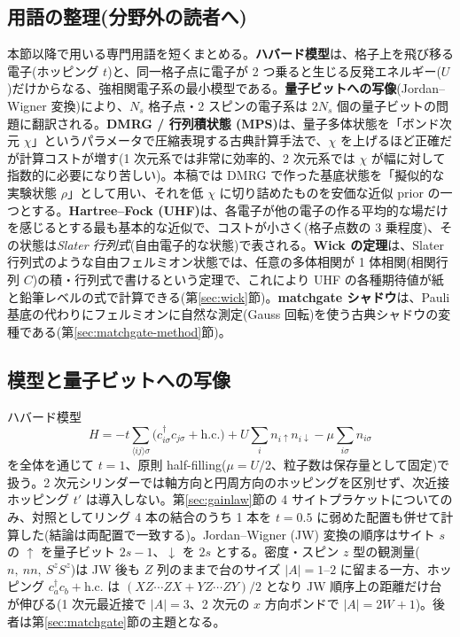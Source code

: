 \documentclass[11pt,a4paper]{ltjsarticle}
\begin{document}
\subsection*{用語の整理(分野外の読者へ)}
本節以降で用いる専門用語を短くまとめる。\textbf{ハバード模型}は、格子上を飛び移る電子(ホッピング $t$)と、同一格子点に電子が 2 つ乗ると生じる反発エネルギー($U$)だけからなる、強相関電子系の最小模型である。\textbf{量子ビットへの写像}(Jordan--Wigner 変換)により、$N_s$ 格子点・2 スピンの電子系は $2N_s$ 個の量子ビットの問題に翻訳される。\textbf{DMRG / 行列積状態 (MPS)}は、量子多体状態を「ボンド次元 $\chi$」というパラメータで圧縮表現する古典計算手法で、$\chi$ を上げるほど正確だが計算コストが増す(1 次元系では非常に効率的、2 次元系では $\chi$ が幅に対して指数的に必要になり苦しい)。本稿では DMRG で作った基底状態を「擬似的な実験状態 $\rho$」として用い、それを低 $\chi$ に切り詰めたものを安価な近似 prior の一つとする。\textbf{Hartree--Fock (UHF)}は、各電子が他の電子の作る平均的な場だけを感じるとする最も基本的な近似で、コストが小さく(格子点数の 3 乗程度)、その状態は\emph{Slater 行列式}(自由電子的な状態)で表される。\textbf{Wick の定理}は、Slater 行列式のような自由フェルミオン状態では、任意の多体相関が 1 体相関(相関行列 $C$)の積・行列式で書けるという定理で、これにより UHF の各種期待値が紙と鉛筆レベルの式で計算できる(第\ref{sec:wick}節)。\textbf{matchgate シャドウ}は、Pauli 基底の代わりにフェルミオンに自然な測定(Gauss 回転)を使う古典シャドウの変種である(第\ref{sec:matchgate-method}節)。

\subsection{模型と量子ビットへの写像}
ハバード模型
\begin{equation}
  H = -t\!\!\sum_{\langle ij\rangle\sigma}\!\!\bigl(c^\dagger_{i\sigma}c_{j\sigma}+\text{h.c.}\bigr) + U\sum_i n_{i\uparrow}n_{i\downarrow} - \mu\sum_{i\sigma}n_{i\sigma}
\end{equation}
を全体を通じて $t=1$、原則 half-filling($\mu=U/2$、粒子数は保存量として固定)で扱う。2 次元シリンダーでは軸方向と円周方向のホッピングを区別せず、次近接ホッピング $t'$ は導入しない。第\ref{sec:gainlaw}節の 4 サイトプラケットについてのみ、対照としてリング 4 本の結合のうち 1 本を $t=0.5$ に弱めた配置も併せて計算した(結論は両配置で一致する)。Jordan--Wigner (JW) 変換の順序はサイト $s$ の $\uparrow$ を量子ビット $2s-1$、$\downarrow$ を $2s$ とする。密度・スピン $z$ 型の観測量($n,\ nn,\ S^zS^z$)は JW 後も $Z$ 列のままで台のサイズ $|A|=1$--$2$ に留まる一方、ホッピング $c^\dagger_a c_b+\text{h.c.}$ は $(XZ\cdots ZX + YZ\cdots ZY)/2$ となり JW 順序上の距離だけ台が伸びる(1 次元最近接で $|A|=3$、2 次元の $x$ 方向ボンドで $|A|=2W+1$)。後者は第\ref{sec:matchgate}節の主題となる。
\end{document}
